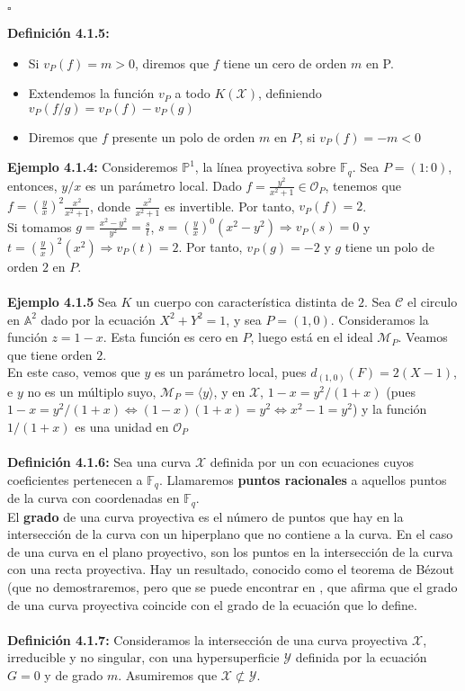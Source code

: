 \documentclass[11pt,spanish]{book}
\newcommand{\qed}{\begin{flushright} $\square$ \end{flushright}}
\begin{document}
\qed
\textbf{Definición 4.1.5: } 
\begin{itemize}
    \item Si $v_P(f)=m>0$, diremos que $f$ tiene un cero de orden $m$ en P. 
    \item Extendemos la función $v_P$ a todo $K(\mathbf{\mathcal{X}})$, definiendo $v_P(f/g)=v_P(f)-v_P(g)$
    \item Diremos que $f$ presente un polo de orden $m$ en $P$, si $v_P(f)=-m<0$
\end{itemize}
\textbf{Ejemplo 4.1.4:} Consideremos $\mathbb{P}^{1}$, la línea proyectiva sobre $\mathbb{F}_q$. Sea $P=(1:0)$, entonces, $y/x$ es un parámetro local. Dado $f=\frac{y^2}{x^2+1}\in \mathcal{O}_P$, tenemos que $f=(\frac{y}{x})^{2}\frac{x^2}{x^2+1}$, donde $\frac{x^2}{x^2+1}$ es invertible. Por tanto, $v_P(f)=2$.\\

Si tomamos $g=\frac{x^2-y^2}{y^2}=\frac{s}{t}$, $s=(\frac{y}{x})^{0}(x^2-y^2)\Rightarrow v_P(s)=0$ y $t=(\frac{y}{x})^{2}(x^2)\Rightarrow v_P(t)=2$. Por tanto, $v_P(g)=-2$ y $g$ tiene un polo de orden $2$ en $P$.\\
\\ \textbf{Ejemplo 4.1.5} Sea $K$ un cuerpo con característica distinta de $2$. Sea $\mathbf{\mathcal{C}}$ el circulo en $\mathbb{A}^2$ dado por la ecuación $X^2+Y^2=1$, y sea $P=(1,0)$. Consideramos la función $z=1-x$. Esta función es cero en $P$, luego está en el ideal $\mathcal{M}_P$. Veamos que tiene orden $2$.\\

En este caso, vemos que $y$ es un parámetro local, pues $d_{(1,0)}(F)=2(X-1)$, e $y$ no es un múltiplo suyo, $\mathcal{M}_P=\langle y\rangle$, y en $\mathbf{\mathcal{X}}$, $1-x=y^2/(1+x)$ (pues $1-x=y^2/(1+x)\Leftrightarrow (1-x)(1+x)=y^2 \Leftrightarrow x^2-1=y^2$) y la función $1/(1+x)$ es una unidad en $\mathcal{O}_P$\\
\\ \textbf{Definición 4.1.6: } Sea una curva $\mathbf{\mathcal{X}}$ definida por un con ecuaciones cuyos coeficientes pertenecen a $\mathbb{F}_q$. Llamaremos \textbf{puntos racionales} a aquellos puntos de la curva con coordenadas en $\mathbb{F}_q$.\\

El \textbf{grado} de una curva proyectiva es el número de puntos que hay en la intersección de la curva con un hiperplano que no contiene a la curva. En el caso de una curva en el plano proyectivo, son los puntos en la intersección de la curva con una recta proyectiva. Hay un resultado, conocido como el teorema de Bézout (que no demostraremos, pero que se puede encontrar en \cite{Tom-Høholdt}, que afirma que el grado de una curva proyectiva coincide con el grado de la ecuación que lo define.\\
\\\hypertarget{intermult}{\textbf{Definición 4.1.7: }}  Consideramos la intersección de una curva proyectiva $\mathbf{\mathcal{X}}$, irreducible y no singular, con una hypersuperficie $\mathbf{\mathcal{Y}}$ definida por la ecuación $G=0$ y de grado $m$. Asumiremos que $\mathbf{\mathcal{X}}\not\subset\mathbf{\mathcal{Y}}$.\\
\end{document}
